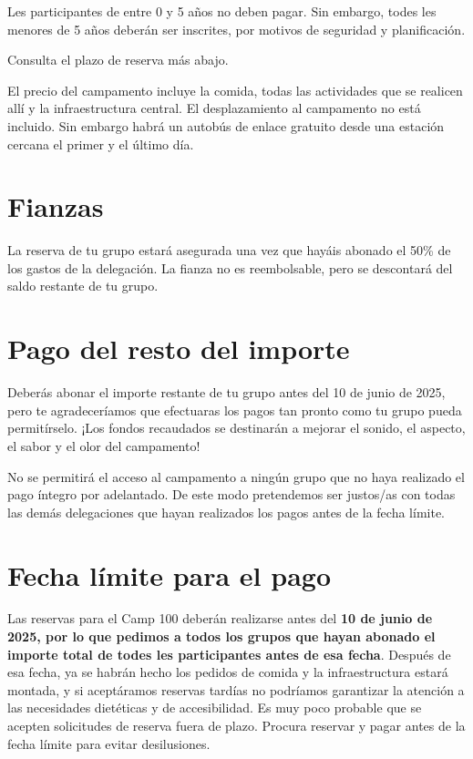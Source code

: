 \documentclass[a4paper, 11pt]{report}
\begin{document}
Les participantes de entre 0 y 5 a\~nos no deben pagar. Sin embargo, todes les menores de 5 a\~nos deber\'an ser inscrites, por motivos de seguridad y planificaci\'on.

Consulta el plazo de reserva m\'as abajo. 

El precio del campamento incluye la comida, todas las actividades que se realicen all\'i y la infraestructura central. El desplazamiento al campamento no est\'a incluido. Sin embargo habr\'a un autob\'us de enlace gratuito desde una estaci\'on cercana el primer y el \'ultimo d\'ia. 


\section{Fianzas}
La reserva de tu grupo estar\'a asegurada una vez que hay\'ais abonado el 50\% de los gastos de la delegaci\'on. La fianza no es reembolsable, pero se descontar\'a del saldo restante de tu grupo.

\section{Pago del resto del importe}
Deber\'as abonar el importe restante de tu grupo antes del 10 de junio de 2025, pero te agradecer\'iamos que efectuaras los pagos tan pronto como tu grupo pueda permit\'irselo. ¡Los fondos recaudados se destinar\'an a mejorar el sonido, el aspecto, el sabor y el olor del campamento! 

No se permitir\'a el acceso al campamento a ning\'un grupo que no haya realizado el pago \'integro por adelantado. De este modo pretendemos ser justos/as con todas las dem\'as delegaciones que hayan realizados los pagos antes de la fecha l\'imite.


\section{Fecha l\'imite para el pago}
Las reservas para el Camp 100 deber\'an realizarse antes del \textbf{10 de junio de 2025, por lo que pedimos a todos los grupos que hayan abonado el importe total de todes les participantes antes de esa fecha}. Despu\'es de esa fecha, ya se habr\'an hecho los pedidos de comida y la infraestructura estar\'a montada, y si acept\'aramos reservas tard\'ias no podr\'iamos garantizar la atenci\'on a las necesidades diet\'eticas y de accesibilidad. Es muy poco probable que se acepten solicitudes de reserva fuera de plazo. Procura reservar y pagar antes de la fecha l\'imite para evitar desilusiones. 
\end{document}
